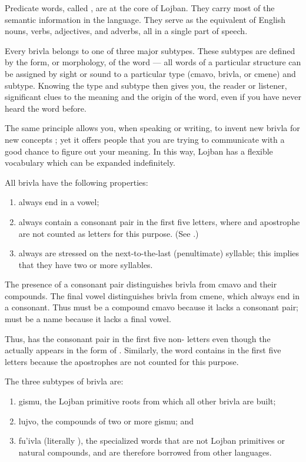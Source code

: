 Predicate words, called , are at the core of Lojban. They carry most of the semantic information in the language. They serve as the equivalent of English nouns, verbs, adjectives, and adverbs, all in a single part of speech.

Every brivla belongs to one of three major subtypes. These subtypes are defined by the form, or morphology, of the word --- all words of a particular structure can be assigned by sight or sound to a particular type (cmavo, brivla, or cmene) and subtype. Knowing the type and subtype then gives you, the reader or listener, significant clues to the meaning and the origin of the word, even if you have never heard the word before.

The same principle allows you, when speaking or writing, to invent new brivla for new concepts ; yet it offers people that you are trying to communicate with a good chance to figure out your meaning. In this way, Lojban has a flexible vocabulary which can be expanded indefinitely.

All brivla have the following properties:
\begin{enumerate}
\item always end in a vowel;
\item always contain a consonant pair in the first five letters, where  and apostrophe are not counted as letters for this purpose. (See .)
\item always are stressed on the next-to-the-last (penultimate) syllable; this implies that they have two or more syllables.
\end{enumerate}

The presence of a consonant pair distinguishes brivla from cmavo and their compounds. The final vowel distinguishes brivla from cmene, which always end in a consonant. Thus  must be a compound cmavo because it lacks a consonant pair;  must be a name because it lacks a final vowel. 

Thus,  has the consonant pair  in the first five non- letters even though the  actually appears in the form of . Similarly, the word  contains  in the first five letters because the apostrophes are not counted for this purpose.

The three subtypes of brivla are:

\begin{enumerate}
\item gismu, the Lojban primitive roots from which all other brivla are built;
\item lujvo, the compounds of two or more gismu; and
\item fu'ivla (literally ), the specialized words that are not Lojban primitives or natural compounds, and are therefore borrowed from other languages.
\end{enumerate}



